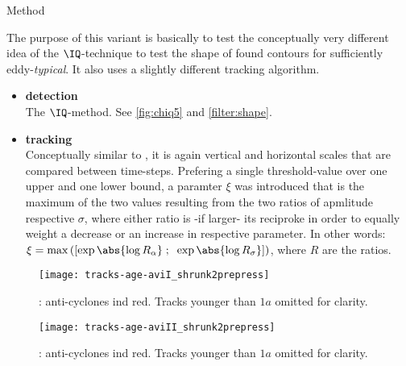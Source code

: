 \begin{cbox}{Method \MII}\label{box:MII}

The purpose of this variant is basically to test the conceptually very different idea of the $\IQ$-technique to test the shape of found contours for sufficiently eddy-\textit{typical}. It also uses a slightly different tracking algorithm.
\begin{itemize}
	\item \textbf{detection}\\
	 The $\IQ$-method. See \cref{fig:chiq5} and \cref{filter:shape}.
	\item \textbf{tracking}\\
	Conceptually similar to \MI, it is again vertical and horizontal scales that are compared between time-steps. Prefering a single threshold-value over one upper and one lower bound, a paramter $\xi$ was introduced that is the maximum of the two values resulting from the two ratios of apmlitude respective $\sigma$, where either ratio is -if larger- its reciproke in order to equally weight a decrease or an increase in respective parameter. In other words:
$\xi = \max{\left(\left[\exp{\abs{\log{R_{\alpha}}}}\; ; \;\; \exp{\abs{\log{R_{\sigma}}}} \right]\right)} $, where $R$ are the ratios.
\end{itemize}
\end{cbox}

\begin{figure}
	\texttt{[image: tracks-age-aviI\_shrunk2prepress]}
	\caption{\MI: anti-cyclones ind red. Tracks younger than $1a$ omitted for clarity.}
	\label{fig:tracks-age-aviI_shrunk2prepress}
\end{figure}

\begin{figure}
	\texttt{[image: tracks-age-aviII\_shrunk2prepress]}
	\caption{\MII: anti-cyclones ind red. Tracks younger than $1a$ omitted for clarity.}
	\label{fig:tracks-age-aviII_shrunk2prepress}
\end{figure}
